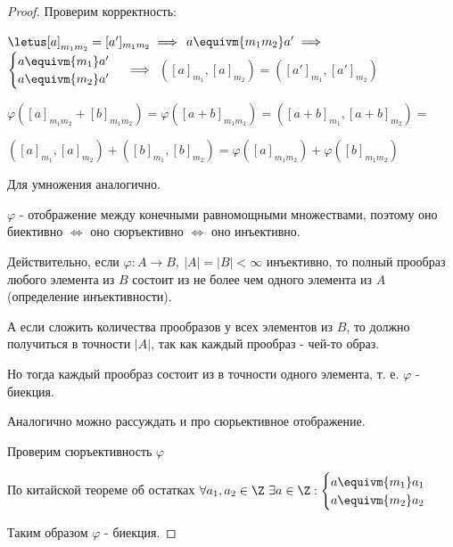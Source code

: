 \begin{proof}
    Проверим корректность:
    
    $\letus [a]_{m_1m_2} = [a']_{m_1m_2} \implies$
    $a \equivm{m_1m_2} a' \implies$
    $\begin{cases}
        a \equivm{m_1} a' \\
        a \equivm{m_2} a'
    \end{cases} \implies$
    $([a]_{m_1}, [a]_{m_2}) = ([a']_{m_1}, [a']_{m_2})$
    
    $\varphi([a]_{m_1m_2} + [b]_{m_1m_2}) = \varphi([a + b]_{m_1m_2}) = ([a + b]_{m_1}, [a + b]_{m_2}) = $
    
    $([a]_{m_1}, [a]_{m_2}) + ([b]_{m_1}, [b]_{m_2}) = \varphi([a]_{m_1m_2}) + \varphi([b]_{m_1m_2})$
    
    Для умножения аналогично.
    
    $\varphi$ - отображение между конечными равномощными множествами, поэтому оно биективно $\iff$ оно сюръективно $\iff$ оно инъективно.

    Действительно, если $\varphi: A \to B,~ |A| = |B| < \infty$ инъективно, 
    то полный прообраз любого элемента из $B$ состоит из не более чем одного элемента из $A$ (определение инъективности). 

    А если сложить количества прообразов у всех элементов из $B$, то должно получиться в точности $|A|$, так как каждый прообраз - чей-то образ. 

    Но тогда каждый прообраз состоит из в точности одного элемента, т. е. $\varphi$ - биекция. 
    
    Аналогично можно рассуждать и про сюрьективное отображение.

    Проверим сюръективность $\varphi$
    
    По китайской теореме об остатках $\forall a_1, a_2 \in \Z~ \exists a \in \Z: 
    \begin{cases}
        a \equivm{m_1} a_1 \\
        a \equivm{m_2} a_2 \\
    \end{cases}$

    Таким образом $\varphi$ - биекция.
\end{proof}


